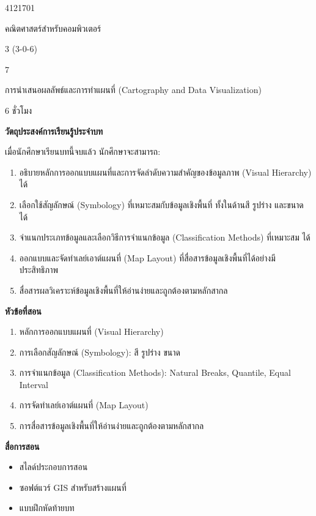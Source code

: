 
\begin{description}[leftmargin=2.5cm, style=nextline]
    \item[รหัสวิชา] 4121701
    \item[ชื่อวิชา] คณิตศาสตร์สำหรับคอมพิวเตอร์
    \item[หน่วยกิต] 3 (3-0-6)
    \item[บทที่] 7
    \item[ชื่อบท] การนำเสนอผลลัพธ์และการทำแผนที่ (Cartography and Data Visualization)
    \item[จำนวนชั่วโมง] 6 ชั่วโมง
\end{description}

\vspace{1em}
\noindent\textbf{วัตถุประสงค์การเรียนรู้ประจำบท}

\noindent เมื่อนักศึกษาเรียนบทนี้จบแล้ว นักศึกษาจะสามารถ:

\begin{enumerate}
    \item อธิบายหลักการออกแบบแผนที่และการจัดลำดับความสำคัญของข้อมูลภาพ (Visual Hierarchy) ได้
    \item เลือกใช้สัญลักษณ์ (Symbology) ที่เหมาะสมกับข้อมูลเชิงพื้นที่ ทั้งในด้านสี รูปร่าง และขนาด ได้
    \item จำแนกประเภทข้อมูลและเลือกวิธีการจำแนกข้อมูล (Classification Methods) ที่เหมาะสม ได้
    \item ออกแบบและจัดทำเลย์เอาต์แผนที่ (Map Layout) ที่สื่อสารข้อมูลเชิงพื้นที่ได้อย่างมีประสิทธิภาพ
    \item สื่อสารผลวิเคราะห์ข้อมูลเชิงพื้นที่ให้อ่านง่ายและถูกต้องตามหลักสากล
\end{enumerate}

\vspace{1em}
\noindent\textbf{หัวข้อที่สอน}

\begin{enumerate}
    \item หลักการออกแบบแผนที่ (Visual Hierarchy)
    \item การเลือกสัญลักษณ์ (Symbology): สี รูปร่าง ขนาด
    \item การจำแนกข้อมูล (Classification Methods): Natural Breaks, Quantile, Equal Interval
    \item การจัดทำเลย์เอาต์แผนที่ (Map Layout)
    \item การสื่อสารข้อมูลเชิงพื้นที่ให้อ่านง่ายและถูกต้องตามหลักสากล
\end{enumerate}

\vspace{1em}
\noindent\textbf{สื่อการสอน}
\begin{itemize}
    \item สไลด์ประกอบการสอน
    \item ซอฟต์แวร์ GIS สำหรับสร้างแผนที่
    \item แบบฝึกหัดท้ายบท
\end{itemize}
